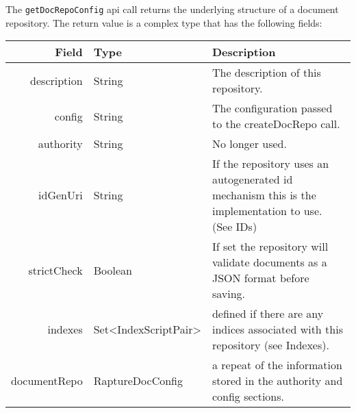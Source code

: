 The \verb+getDocRepoConfig+ api call returns the underlying structure of a document repository. The return
value is a complex type that has the following fields:

\begin{table}[h]
  \small
\begin{center}
\begin{tabular}{r l p{7cm}}
  Field & Type & Description \\
  \hline
  description & String & The description of this repository. \\
  config & String & The configuration passed to the createDocRepo call. \\
  authority & String & No longer used. \\
  idGenUri & String & If the repository uses an autogenerated id mechanism this is the implementation to use. (See IDs) \\
  strictCheck & Boolean & If set the repository will validate documents as a JSON format before saving. \\
  indexes & Set<IndexScriptPair> & defined if there are any indices associated with this repository (see Indexes). \\
  documentRepo & RaptureDocConfig & a repeat of the information stored in the authority and config sections. \\
\end{tabular}
\end{center}
\end{table}
